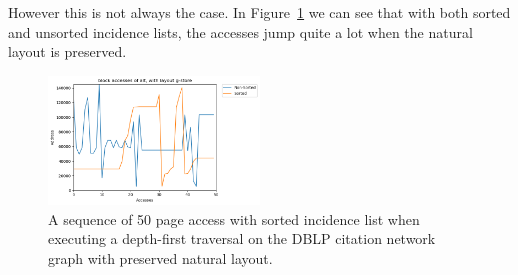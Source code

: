     However this is not always the case. In Figure~\ref{dblp_ng} we can see that with both sorted and unsorted incidence lists, the accesses jump quite a lot when the natural layout is preserved.
    \begin{figure}[htp]
        \begin{center}
            \includegraphics[keepaspectratio,width=0.5\textwidth]{img/07-eval/dblp_g-store_alt_block_sil_access_seq.png}
        \end{center}
        \caption{A sequence of 50 page access with sorted incidence list when executing a depth-first traversal on the DBLP citation network graph with preserved natural layout.} 
        \label{dblp_ng}
    \end{figure}
